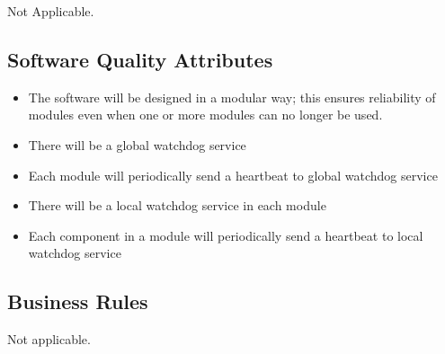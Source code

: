 Not Applicable.
\par

\subsection{Software Quality Attributes}
\label{sec:quality}

\begin{itemize}
    \item The software will be designed in a modular way; this ensures reliability of modules even when one or more modules can no longer be used. 
    \item There will be a global watchdog service 
    \item Each module will periodically send a heartbeat to global watchdog service 
    \item There will be a local watchdog service in each module 
    \item Each component in a module will periodically send a heartbeat to local watchdog service
\end{itemize}

\subsection{Business Rules}
\label{sec:business}

Not applicable.
\par

